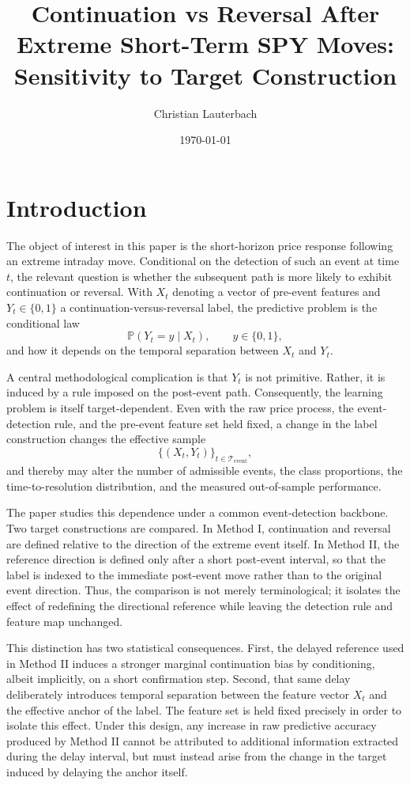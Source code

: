 \documentclass[11pt,a4paper]{article}
\title{Continuation vs Reversal After Extreme Short-Term SPY Moves: Sensitivity to Target Construction}
\author{Christian Lauterbach}
\date{\today}
\begin{document}
	
	\maketitle
	\tableofcontents
	\newpage
	
	\section{Introduction}

	The object of interest in this paper is the short-horizon price response following an extreme intraday move. Conditional on the detection of such an event at time \(t\), the relevant question is whether the subsequent path is more likely to exhibit continuation or reversal. With \(X_t\) denoting a vector of pre-event features and \(Y_t \in \{0,1\}\) a continuation-versus-reversal label, the predictive problem is the conditional law
	\[
	\mathbb{P}(Y_t = y \mid X_t), \qquad y \in \{0,1\},
	\]
	and how it depends on the temporal separation between \(X_t\) and \(Y_t\).

	A central methodological complication is that \(Y_t\) is not primitive. Rather, it is induced by a rule imposed on the post-event path. Consequently, the learning problem is itself target-dependent. Even with the raw price process, the event-detection rule, and the pre-event feature set held fixed, a change in the label construction changes the effective sample
	\[
	\{(X_t,Y_t)\}_{t \in \mathcal{T}_{\mathrm{event}}},
	\]
	and thereby may alter the number of admissible events, the class proportions, the time-to-resolution distribution, and the measured out-of-sample performance.

	The paper studies this dependence under a common event-detection backbone. Two target constructions are compared. In Method I, continuation and reversal are defined relative to the direction of the extreme event itself. In Method II, the reference direction is defined only after a short post-event interval, so that the label is indexed to the immediate post-event move rather than to the original event direction. Thus, the comparison is not merely terminological; it isolates the effect of redefining the directional reference while leaving the detection rule and feature map unchanged.

	This distinction has two statistical consequences. First, the delayed reference used in Method II induces a stronger marginal continuation bias by conditioning, albeit implicitly, on a short confirmation step. Second, that same delay deliberately introduces temporal separation between the feature vector \(X_t\) and the effective anchor of the label. The feature set is held fixed precisely in order to isolate this effect. Under this design, any increase in raw predictive accuracy produced by Method II cannot be attributed to additional information extracted during the delay interval, but must instead arise from the change in the target induced by delaying the anchor itself.
\end{document}
